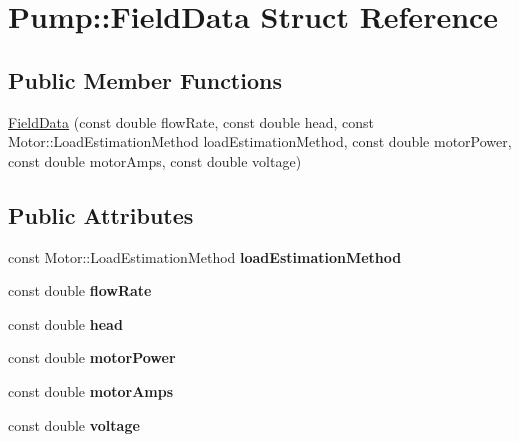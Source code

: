 \hypertarget{struct_pump_1_1_field_data}{}\section{Pump\+:\+:Field\+Data Struct Reference}
\label{struct_pump_1_1_field_data}
\subsection*{Public Member Functions}
\begin{DoxyCompactItemize}
\item 
\hyperlink{struct_pump_1_1_field_data_ad35a6b6b9a02174c0e32ed6adebb8b75}{Field\+Data} (const double flow\+Rate, const double head, const Motor\+::\+Load\+Estimation\+Method load\+Estimation\+Method, const double motor\+Power, const double motor\+Amps, const double voltage)
\end{DoxyCompactItemize}
\subsection*{Public Attributes}
\begin{DoxyCompactItemize}
\item 
\mbox{\label{struct_pump_1_1_field_data_a26ec49662d5866c00ddb8df278261321}} 
const Motor\+::\+Load\+Estimation\+Method {\bfseries load\+Estimation\+Method}
\item 
\mbox{\label{struct_pump_1_1_field_data_a84c512ac749541c91b2fbe6d3f971182}} 
const double {\bfseries flow\+Rate}
\item 
\mbox{\label{struct_pump_1_1_field_data_abc76e0e2dc15fb4d97fbe39405912e60}} 
const double {\bfseries head}
\item 
\mbox{\label{struct_pump_1_1_field_data_a2b39c288d86eda22190818bbf1672d28}} 
const double {\bfseries motor\+Power}
\item 
\mbox{\label{struct_pump_1_1_field_data_a9610ce4050705dfad60b159e6dec8bfa}} 
const double {\bfseries motor\+Amps}
\item 
\mbox{\label{struct_pump_1_1_field_data_a2b09518966e012112d44c78439ef28ba}} 
const double {\bfseries voltage}
\end{DoxyCompactItemize}


